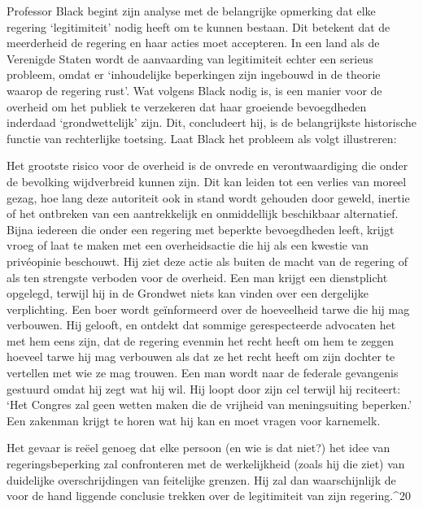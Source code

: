 \documentclass[
  a5paper,
  smalldemyvopaper,10pt,twoside,onecolumn,openright,extrafontsizes,hidelinks]{memoir}
\renewenvironment{quote}%
               {\list{}{\rightmargin=.6cm\leftmargin=.6cm}%
                \itshape \item[]}%
               {\endlist}
\begin{document}
Professor Black begint zijn analyse met de belangrijke opmerking dat
elke regering `legitimiteit' nodig heeft om te kunnen bestaan. Dit
betekent dat de meerderheid de regering en haar acties moet accepteren.
In een land als de Verenigde Staten wordt de aanvaarding van
legitimiteit echter een serieus probleem, omdat er `inhoudelijke
beperkingen zijn ingebouwd in de theorie waarop de regering rust'. Wat
volgens Black nodig is, is een manier voor de overheid om het publiek te
verzekeren dat haar groeiende bevoegdheden inderdaad `grondwettelijk'
zijn. Dit, concludeert hij, is de belangrijkste historische functie van
rechterlijke toetsing. Laat Black het probleem als volgt illustreren:

\begin{quote}
Het grootste risico voor de overheid is de onvrede en verontwaardiging
die onder de bevolking wijdverbreid kunnen zijn. Dit kan leiden tot een
verlies van moreel gezag, hoe lang deze autoriteit ook in stand wordt
gehouden door geweld, inertie of het ontbreken van een aantrekkelijk en
onmiddellijk beschikbaar alternatief. Bijna iedereen die onder een
regering met beperkte bevoegdheden leeft, krijgt vroeg of laat te maken
met een overheidsactie die hij als een kwestie van privéopinie
beschouwt. Hij ziet deze actie als buiten de macht van de regering of
als ten strengste verboden voor de overheid. Een man krijgt een
dienstplicht opgelegd, terwijl hij in de Grondwet niets kan vinden over
een dergelijke verplichting. Een boer wordt geïnformeerd over de
hoeveelheid tarwe die hij mag verbouwen. Hij gelooft, en ontdekt dat
sommige gerespecteerde advocaten het met hem eens zijn, dat de regering
evenmin het recht heeft om hem te zeggen hoeveel tarwe hij mag verbouwen
als dat ze het recht heeft om zijn dochter te vertellen met wie ze mag
trouwen. Een man wordt naar de federale gevangenis gestuurd omdat hij
zegt wat hij wil. Hij loopt door zijn cel terwijl hij reciteert: `Het
Congres zal geen wetten maken die de vrijheid van meningsuiting
beperken.' Een zakenman krijgt te horen wat hij kan en moet vragen voor
karnemelk.

Het gevaar is reëel genoeg dat elke persoon (en wie is dat niet?) het
idee van regeringsbeperking zal confronteren met de werkelijkheid (zoals
hij die ziet) van duidelijke overschrijdingen van feitelijke grenzen.
Hij zal dan waarschijnlijk de voor de hand liggende conclusie trekken
over de legitimiteit van zijn regering.\^{}20
\end{quote}
\end{document}
